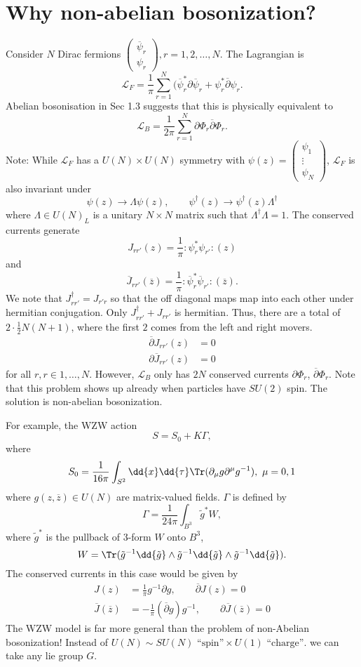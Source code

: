 \documentclass[twoside,symmetric, openany, 12pt]{./tuftebook}
\theoremstyle{definition}
\theoremstyle{definition}
\theoremstyle{definition}
\begin{document}
\section{Why non-abelian bosonization?}
Consider $N$ Dirac fermions $\begin{pmatrix} \overline{\psi}_r \\ \psi_r \end{pmatrix} , r= 1,2,\ldots, N$. The Lagrangian is
\[
	\mathcal{L}_F = \frac{1}{\pi}\sum_{r=1}^N (\overline{\psi}_r^* \partial \overline{\psi}_r + \psi_r^* \overline{\partial}\psi_r
.\] 
Abelian bosonisation in Sec 1.3 suggests that this is physically equivalent to
\[
	\mathcal{L}_B = \frac{1}{2\pi}\sum_{r=1}^N \partial \Phi_r \overline{\partial}\Phi_r
.\] 
Note: While $\mathcal{L}_F$ has a $U(N) \times U(N)$ symmetry with $\psi(z) = \begin{pmatrix}  \psi_1 \\ \vdots \\ \psi_N \end{pmatrix} $, $\mathcal{L}_F$ is also invariant under
\[
\psi(z) \to \Lambda \psi(z), \qquad \psi^\dagger(z) \to \psi^\dagger(z) \Lambda^\dagger
\]
where $\Lambda\in U(N)_L$ is a unitary $N\times N$ matrix such that $\Lambda^\dagger \Lambda = 1$. The conserved currents generate
\[
	J_{rr'}(z) = \frac{1}{\pi}:\psi_r^*\psi_{r'}:(z)
\]
and
\[
	\overline{J}_{rr'}(\overline{z}) = \frac{1}{\pi}:\overline{\psi}_r^* \overline{\psi}_{r'}:(\overline{z}) 
.\] 
We note that $J_{rr'}^\dagger = J_{r'r}$ so that the off diagonal maps map into each other under hermitian conjugation. Only $J_{rr'}^\dagger + J_{rr'}$ is hermitian. Thus, there are a total of $2 \cdot \frac{1}{2}N(N+1)$, where the first $2$ comes from the left and right movers.
\begin{align*}
	\overline{\partial}J_{rr'}(z) &= 0\\
	\partial \overline{J}_{rr'}(z) &= 0
\end{align*}
for all $r,r\in 1,\ldots, N$. However, $\mathcal{L}_B$ only has $2N$ conserved currents $\partial \Phi_r$, $\overline{\partial}\Phi_r$. Note that this problem shows up already when particles have $SU(2)$ spin. The solution is non-abelian bosonization.

For example, the WZW action
\[
S = S_0 + K \Gamma
,\]
where
\[
	S_0 = \frac{1}{16\pi}\int_{S^2}\dd{x}\dd{\tau} \Tr(\partial_\mu g \partial^\mu g^{-1}), ~\mu = 0,1
\]  
where $g(z,\overline{z})\in U(N)$ are matrix-valued fields. $\Gamma$ is defined by
\[
	\Gamma = \frac{1}{24\pi}\int_{B^3} \tilde{g}^* W
,\]
where $\tilde{g}^*$ is the pullback of 3-form $W$ onto $B^3$,
\[
	W = \Tr(\tilde{g}^{-1}\dd{\tilde{g}} \wedge \tilde{g}^{-1} \dd{\tilde{g}} \wedge \tilde{g}^{-1}\dd{\tilde{g}})
.\] 
The conserved currents in this case would be given by
\begin{align*}
	J(z) &=  \frac{1}{\pi}g^{-1}\partial g, \qquad \overline{\partial}J(z) = 0 \\
	\overline{J}(\overline{z}) &= -\frac{1}{\pi}(\overline{\partial}g)g^{-1},\qquad \partial \overline{J}(\overline{z}) = 0
\end{align*}
The WZW model is far more general than the problem of non-Abelian bosonization! Instead of $U(N)\sim SU(N)\text{ ``spin''}\times U(1)\text{ ``charge''}$. we can take any lie group  $G$.
\end{document}
